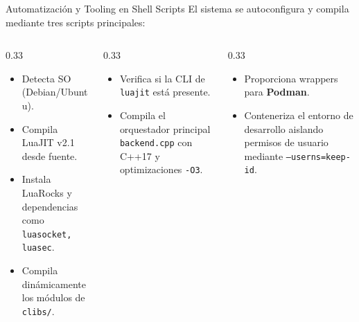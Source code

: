 \documentclass[10pt,aspectratio=169]{beamer}
\begin{document}
\begin{frame}[fragile]{Automatización y Tooling en Shell Scripts}
    El sistema se autoconfigura y compila mediante tres scripts principales:

    \begin{columns}[T]
        \begin{column}{0.33\textwidth}
            \begin{itemize}
                \item Detecta SO (Debian/Ubuntu).
                \item Compila LuaJIT v2.1 desde fuente.
                \item Instala LuaRocks y dependencias como \texttt{luasocket, luasec}.
                \item Compila dinámicamente los módulos de \texttt{clibs/}.
            \end{itemize}
        \end{column}
        \begin{column}{0.33\textwidth}
            \begin{itemize} 
                \item Verifica si la CLI de \texttt{luajit} está presente.
                \item Compila el orquestador principal \texttt{backend.cpp} con C++17 y optimizaciones \texttt{-O3}.
            \end{itemize}
        \end{column}
        \begin{column}{0.33\textwidth}
            \begin{itemize}
                \item Proporciona wrappers para \textbf{Podman}.
                \item Conteneriza el entorno de desarrollo aislando permisos de usuario mediante \texttt{--userns=keep-id}.
            \end{itemize}
        \end{column}
    \end{columns}
\end{frame}
\end{document}

